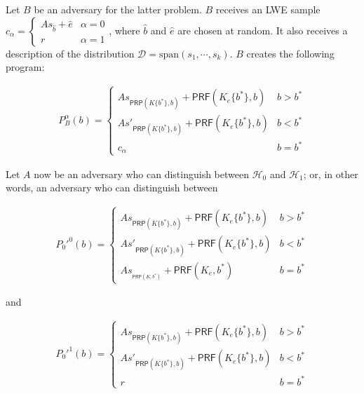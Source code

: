 \documentclass{article}
\begin{document}
\begin{itemize}
\begin{itemize}
        Let $B$ be an adversary for the latter problem. $B$ receives an LWE sample $c_\alpha = \begin{cases} As_{\widehat b} + \hat e & \alpha = 0 \\ r & \alpha = 1\end{cases}$, where $\hat b$ and $\hat e$ are chosen at random. It also receives a description of the distribution $\mathcal{D} = \mathrm{span}(s_1, \cdots, s_k)$. $B$ creates the following program:
        
        \begin{align}
            P_B^\alpha(b) = 
            \begin{cases}
                As_{\textsf{PRP}(K\{b^*\}, b)} + \textsf{PRF}(K_e\{b^*\}, b) & b > b^* \\
                As'_{\textsf{PRP}(K\{b^*\}, b)} + \textsf{PRF}(K_e\{b^*\}, b) & b < b^* \\
                c_\alpha & b = b^*
            \end{cases}
        \end{align}
        
        Let $A$ now be an adversary who can distinguish between $\mathcal{H}_0$ and $\mathcal{H}_1$; or, in other words, an adversary who can distinguish between
        
        \begin{align}
            P_0'^0(b) = 
            \begin{cases}
                As_{\textsf{PRP}(K\{b^*\}, b)} + \textsf{PRF}(K_e\{b^*\}, b) & b > b^* \\
                As'_{\textsf{PRP}(K\{b^*\}, b)} + \textsf{PRF}(K_e\{b^*\}, b) & b < b^* \\
                As_{_{\textsf{PRP}(K, b^*)}} + \textsf{PRF}(K_e, b^*) & b = b^*
            \end{cases}
        \end{align}
        
        and 
        
        \begin{align}
            P_0'^1(b) = 
            \begin{cases}
                As_{\textsf{PRP}(K\{b^*\}, b)} + \textsf{PRF}(K_e\{b^*\}, b) & b > b^* \\
                As'_{\textsf{PRP}(K\{b^*\}, b)} + \textsf{PRF}(K_e\{b^*\}, b) & b < b^* \\
                r & b = b^*
            \end{cases}
        \end{align}
        

\end{itemize}
\end{itemize}
\end{document}
